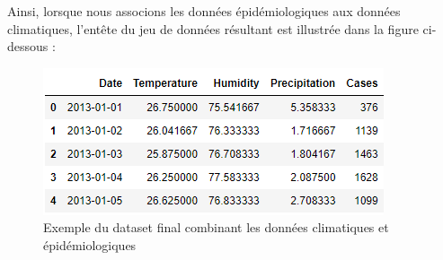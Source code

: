 Ainsi, lorsque nous associons les données épidémiologiques aux données climatiques, l'entête du jeu de données résultant est illustrée dans la figure ci-dessous :
\begin{figure}[h!]
	\centering
	\includegraphics[width=0.7\linewidth]{images/dataset_sample}
	\caption{Exemple du dataset final combinant les données climatiques et épidémiologiques}
	\label{fig:datasetsample}
\end{figure}

